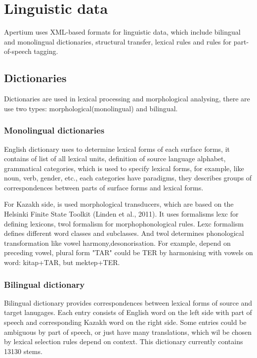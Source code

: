 \documentclass[11pt]{article}
\begin{document}
\section{Linguistic data}

Apertium uses XML-based formats for linguistic data, which include bilingual and monolingual dictionaries, structural transfer, lexical rules and rules for part-of-speech tagging.

\subsection{Dictionaries}

Dictionaries are used in lexical processing and morphological analysing, there are use two types: morphological(monolingual) and bilingual.

\subsubsection{Monolingual dictionaries}

English dictionary uses to determine lexical forms of each surface forms, it contains of list of all lexical units, definition of source language alphabet, grammatical categories, which is used to specify lexical forms, for example, like noun, verb, gender, etc., each categories have paradigms, they describes groups of correspondences between parts of surface forms and lexical forms. 

For Kazakh side, is used morphological transducers, which are based on the Helsinki
Finite State Toolkit (Linden et al., 2011). It uses formalisms lexc for defining lexicons, twol formalism for morphophonological rules. Lexc formalism defines different word classes and subclasses. And twol determines phonological transformation like vowel harmony,desonorisation. For example, depend on preceding vowel, plural form "TAR" could be TER by harmonising with vowels on word: kitap+TAR, but mektep+TER.

\subsubsection{Bilingual dictionary}

Bilingual dictionary provides correspondences between lexical forms of source and target lanugages. Each entry consists of English word on the left side with part of speech and corresponding Kazakh word on the right side. Some entries could be ambiguous by part of speech, or just have many translations, which wil be chosen by lexical selection rules depend on context. This dictionary currently contains 13130 stems.
\end{document}
